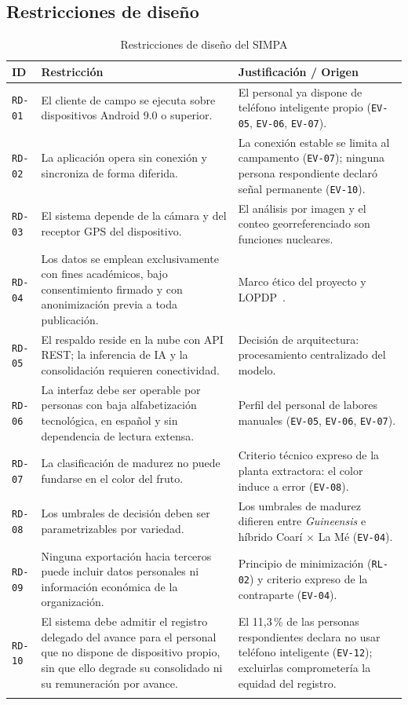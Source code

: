 \documentclass[11pt,a4paper]{article}
\newcommand{\id}[1]{\texttt{#1}}
\begin{document}
\subsection{Restricciones de diseño}

\begin{longtable}{|C{1.3cm}|L{5.9cm}|L{5.2cm}|}
\hline
{}\textbf{ID} & \textbf{Restricción} & \textbf{Justificación / Origen} \\
\hline
\endhead
\id{RD-01} & El cliente de campo se ejecuta sobre dispositivos Android 9.0 o superior. & El
personal ya dispone de teléfono inteligente propio (\id{EV-05}, \id{EV-06}, \id{EV-07}). \\ \hline
\id{RD-02} & La aplicación opera sin conexión y sincroniza de forma diferida. & La conexión estable
se limita al campamento (\id{EV-07}); ninguna persona respondiente declaró señal permanente
(\id{EV-10}). \\ \hline
\id{RD-03} & El sistema depende de la cámara y del receptor GPS del dispositivo. & El análisis por
imagen y el conteo georreferenciado son funciones nucleares. \\ \hline
\id{RD-04} & Los datos se emplean exclusivamente con fines académicos, bajo consentimiento firmado
y con anonimización previa a toda publicación. & Marco ético del proyecto y LOPDP~\cite{lopdp2021}.
\\ \hline
\id{RD-05} & El respaldo reside en la nube con API REST; la inferencia de IA y la consolidación
requieren conectividad. & Decisión de arquitectura: procesamiento centralizado del modelo. \\ \hline
\id{RD-06} & La interfaz debe ser operable por personas con baja alfabetización tecnológica, en
español y sin dependencia de lectura extensa. & Perfil del personal de labores manuales (\id{EV-05},
\id{EV-06}, \id{EV-07}). \\ \hline
\id{RD-07} & La clasificación de madurez no puede fundarse en el color del fruto. & Criterio técnico
expreso de la planta extractora: el color induce a error (\id{EV-08}). \\ \hline
\id{RD-08} & Los umbrales de decisión deben ser parametrizables por variedad. & Los umbrales de
madurez difieren entre \emph{Guineensis} e híbrido Coarí $\times$ La Mé (\id{EV-04}). \\ \hline
\id{RD-09} & Ninguna exportación hacia terceros puede incluir datos personales ni información
económica de la organización. & Principio de minimización (\id{RL-02}) y criterio expreso de la
contraparte (\id{EV-04}). \\ \hline
\id{RD-10} & El sistema debe admitir el registro delegado del avance para el personal que no
dispone de dispositivo propio, sin que ello degrade su consolidado ni su remuneración por avance. &
El 11{,}3\,\% de las personas respondientes declara no usar teléfono inteligente (\id{EV-12});
excluirlas comprometería la equidad del registro. \\ \hline
\caption{Restricciones de diseño del SIMPA}
\label{tab:rd}
\end{longtable}
\end{document}
